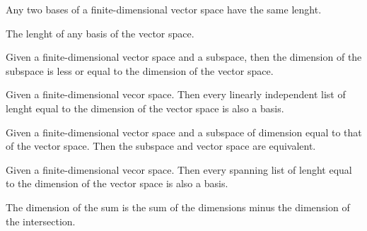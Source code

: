 \begin{multicols}{3}
  Any two bases of a finite-dimensional vector space have the same lenght.
  
  The lenght of any basis of the vector space.
  
  Given a finite-dimensional vector space and a subspace, then the dimension of the subspace is less or equal to the dimension of the vector space.
  
  Given a finite-dimensional vecor space. Then every linearly independent list of lenght equal to the dimension of the vector space is also a basis.
  
  Given a finite-dimensional vector space and a subspace of dimension equal to that of the vector space. Then the subspace and vector space are equivalent.
  
  Given a finite-dimensional vecor space. Then every spanning list of lenght equal to the dimension of the vector space is also a basis.
  
  The dimension of the sum is the sum of the dimensions minus the dimension of the intersection.

\end{multicols}


